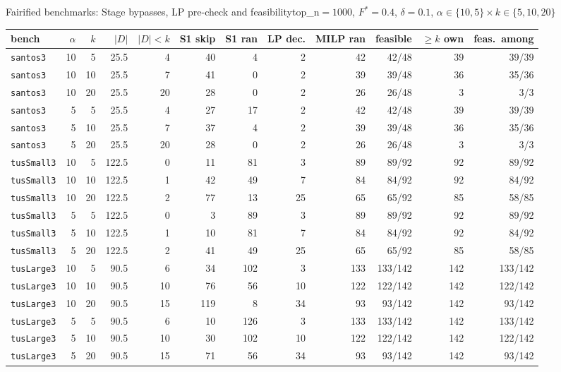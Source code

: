 \documentclass[aspectratio=169,10pt]{beamer}
\begin{document}
\begin{frame}{Fairified benchmarks: Stage bypasses, LP pre-check and feasibility}{top\_n$=1000$, $F^*{=}0.4$, $\delta{=}0.1$, $\alpha\in\{10,5\}\times k\in\{5,10,20\}$}
\scriptsize
\begin{center}
\setlength{\tabcolsep}{2.5pt}
\begin{tabular}{lrrrrrrrrrrr}
\toprule
bench & $\alpha$ & $k$ & $|D|$ & $|D|{<}k$ & S1 skip & S1 ran & LP dec. & MILP ran & feasible & $\ge k$ own & feas.\ among \\
\midrule
\texttt{santos3} & 10 & 5 & 25.5 & 4 & 40 & 4 & 2 & 42 & 42/48 & 39 & 39/39 \\
\texttt{santos3} & 10 & 10 & 25.5 & 7 & 41 & 0 & 2 & 39 & 39/48 & 36 & 35/36 \\
\texttt{santos3} & 10 & 20 & 25.5 & 20 & 28 & 0 & 2 & 26 & 26/48 & 3 & 3/3 \\
\texttt{santos3} & 5 & 5 & 25.5 & 4 & 27 & 17 & 2 & 42 & 42/48 & 39 & 39/39 \\
\texttt{santos3} & 5 & 10 & 25.5 & 7 & 37 & 4 & 2 & 39 & 39/48 & 36 & 35/36 \\
\texttt{santos3} & 5 & 20 & 25.5 & 20 & 28 & 0 & 2 & 26 & 26/48 & 3 & 3/3 \\
\texttt{tusSmall3} & 10 & 5 & 122.5 & 0 & 11 & 81 & 3 & 89 & 89/92 & 92 & 89/92 \\
\texttt{tusSmall3} & 10 & 10 & 122.5 & 1 & 42 & 49 & 7 & 84 & 84/92 & 92 & 84/92 \\
\texttt{tusSmall3} & 10 & 20 & 122.5 & 2 & 77 & 13 & 25 & 65 & 65/92 & 85 & 58/85 \\
\texttt{tusSmall3} & 5 & 5 & 122.5 & 0 & 3 & 89 & 3 & 89 & 89/92 & 92 & 89/92 \\
\texttt{tusSmall3} & 5 & 10 & 122.5 & 1 & 10 & 81 & 7 & 84 & 84/92 & 92 & 84/92 \\
\texttt{tusSmall3} & 5 & 20 & 122.5 & 2 & 41 & 49 & 25 & 65 & 65/92 & 85 & 58/85 \\
\texttt{tusLarge3} & 10 & 5 & 90.5 & 6 & 34 & 102 & 3 & 133 & 133/142 & 142 & 133/142 \\
\texttt{tusLarge3} & 10 & 10 & 90.5 & 10 & 76 & 56 & 10 & 122 & 122/142 & 142 & 122/142 \\
\texttt{tusLarge3} & 10 & 20 & 90.5 & 15 & 119 & 8 & 34 & 93 & 93/142 & 142 & 93/142 \\
\texttt{tusLarge3} & 5 & 5 & 90.5 & 6 & 10 & 126 & 3 & 133 & 133/142 & 142 & 133/142 \\
\texttt{tusLarge3} & 5 & 10 & 90.5 & 10 & 30 & 102 & 10 & 122 & 122/142 & 142 & 122/142 \\
\texttt{tusLarge3} & 5 & 20 & 90.5 & 15 & 71 & 56 & 34 & 93 & 93/142 & 142 & 93/142 \\
\bottomrule
\end{tabular}
\end{center}
\end{frame}
\end{document}
